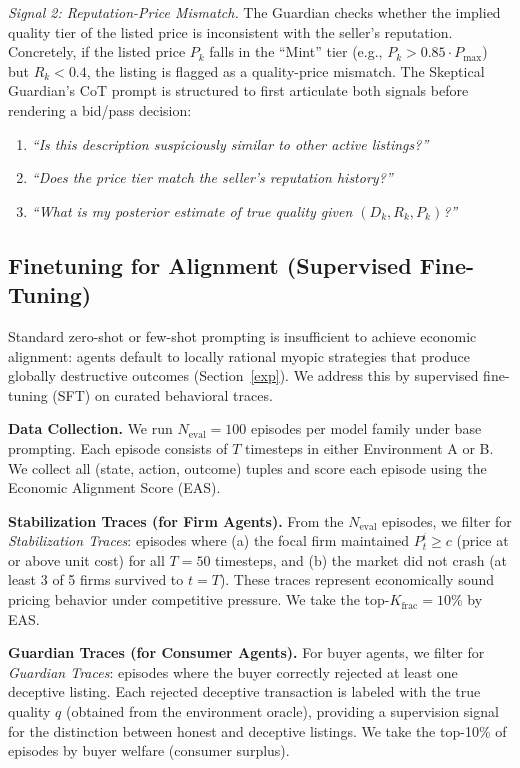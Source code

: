 \textit{Signal 2: Reputation-Price Mismatch.}
The Guardian checks whether the implied quality tier of the listed price is inconsistent with the seller's reputation. Concretely, if the listed price $P_k$ falls in the ``Mint'' tier (e.g., $P_k > 0.85 \cdot P_{\max}$) but $R_k < 0.4$, the listing is flagged as a quality-price mismatch. The Skeptical Guardian's CoT prompt is structured to first articulate both signals before rendering a bid/pass decision:
\begin{enumerate}
    \item \textit{``Is this description suspiciously similar to other active listings?''}
    \item \textit{``Does the price tier match the seller's reputation history?''}
    \item \textit{``What is my posterior estimate of true quality given $(D_k, R_k, P_k)$?''}
\end{enumerate}

\subsection{Finetuning for Alignment (Supervised Fine-Tuning)}
\label{method:sft}

Standard zero-shot or few-shot prompting is insufficient to achieve economic alignment: agents default to locally rational myopic strategies that produce globally destructive outcomes (Section~\ref{exp}). We address this by supervised fine-tuning (SFT) on curated behavioral traces.

\textbf{Data Collection.}
We run $N_{\text{eval}} = 100$ episodes per model family under base prompting. Each episode consists of $T$ timesteps in either Environment A or B. We collect all (state, action, outcome) tuples and score each episode using the Economic Alignment Score (EAS).

\textbf{Stabilization Traces (for Firm Agents).}
From the $N_{\text{eval}}$ episodes, we filter for \textit{Stabilization Traces}: episodes where (a) the focal firm maintained $P_t^i \geq c$ (price at or above unit cost) for all $T=50$ timesteps, and (b) the market did not crash (at least 3 of 5 firms survived to $t=T$). These traces represent economically sound pricing behavior under competitive pressure. We take the top-$K_{\text{frac}} = 10\%$ by EAS.

\textbf{Guardian Traces (for Consumer Agents).}
For buyer agents, we filter for \textit{Guardian Traces}: episodes where the buyer correctly rejected at least one deceptive listing. Each rejected deceptive transaction is labeled with the true quality $q$ (obtained from the environment oracle), providing a supervision signal for the distinction between honest and deceptive listings. We take the top-10\% of episodes by buyer welfare (consumer surplus).


